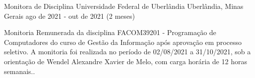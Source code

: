 \cventry
    {Monitora de Disciplina} %
    {Universidade Federal de Uberlândia} %
    {Uberlândia, Minas Gerais} %
    {ago de 2021 - out de 2021 (2 meses)} %
    {
        \begin{cvitems} %
            \item {Monitoria Remunerada da disciplina FACOM39201 - Programação de Computadores do curso de Gestão da Informação após aprovação em processo seletivo. A monitoria foi realizada no período de 02/08/2021 a 31/10/2021, sob a orientação de Wendel Alexandre Xavier de Melo, com carga horária de 12 horas semanais..}
        \end{cvitems}
    }